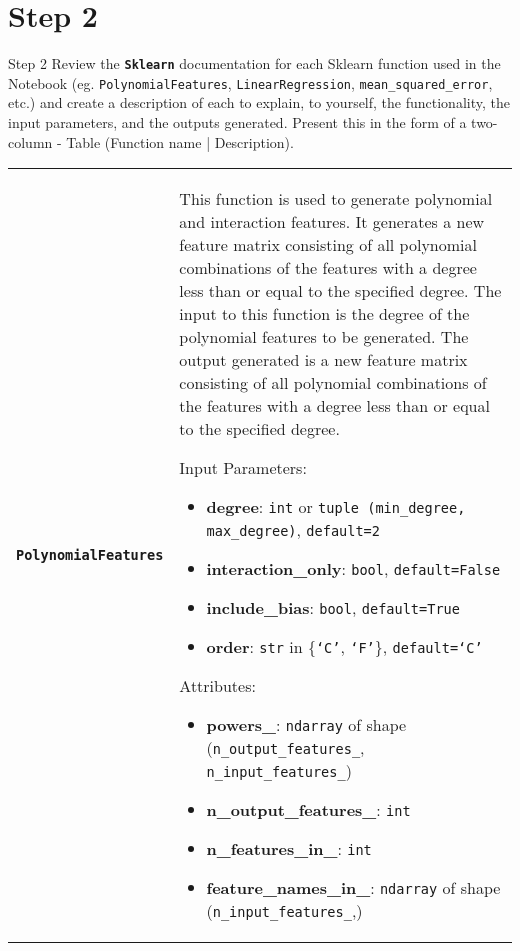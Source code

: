 \section*{Step 2}

\begin{custombox}[label={box:Q2}]{Step 2}
	Review the \textbf{\texttt{Sklearn}} documentation for each Sklearn function used in the Notebook (eg. \verb|PolynomialFeatures|, \verb|LinearRegression|, \verb|mean_squared_error|, etc.) and create a description of each to explain, to yourself, the functionality, the input parameters, and the outputs generated. Present this in the form of a two-column - Table (Function name | Description).
\end{custombox}

\begin{longtable}{|l|p{12cm}|}
    \hline
    \textbf{\texttt{PolynomialFeatures}} & 
    This function is used to generate polynomial and interaction features. It generates a new feature matrix consisting of all polynomial combinations of the features with a degree less than or equal to the specified degree. The input to this function is the degree of the polynomial features to be generated. The output generated is a new feature matrix consisting of all polynomial combinations of the features with a degree less than or equal to the specified degree.

    Input Parameters:
    \begin{itemize}
        \item \textbf{degree}: \texttt{int} or \texttt{tuple (min\_degree, max\_degree)}, \texttt{default=2}
        \item \textbf{interaction\_only}: \texttt{bool}, \texttt{default=False}
        \item \textbf{include\_bias}: \texttt{bool}, \texttt{default=True}
        \item \textbf{order}: \texttt{str} in \{\texttt{`C'}, \texttt{`F'}\}, \texttt{default=`C'}
    \end{itemize}

    Attributes:
    \begin{itemize}
        \item \textbf{powers\_}: \texttt{ndarray} of shape (\texttt{n\_output\_features\_}, \texttt{n\_input\_features\_})
        \item \textbf{n\_output\_features\_}: \texttt{int}
        \item \textbf{n\_features\_in\_}: \texttt{int}
        \item \textbf{feature\_names\_in\_}: \texttt{ndarray} of shape (\texttt{n\_input\_features\_},)
    \end{itemize}


\end{longtable}
